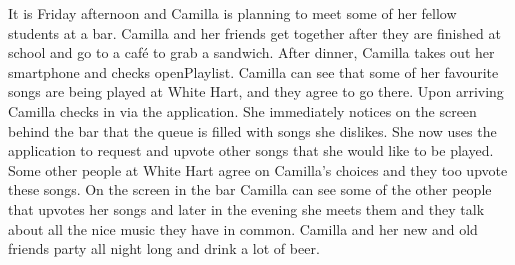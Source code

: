 It is Friday afternoon and Camilla is planning to meet some of her fellow students at a bar. Camilla and her friends get together after they are finished at school and go to a café to grab a sandwich. After dinner, Camilla takes out her smartphone and checks openPlaylist. Camilla can see that some of her favourite songs are being played at White Hart, and they agree to go there. Upon arriving Camilla checks in via the application. She immediately notices on the screen behind the bar that the queue is filled with songs she dislikes. She now uses the application to request and upvote other songs that she would like to be played. Some other people at White Hart agree on Camilla's choices and they too upvote these songs. On the screen in the bar Camilla can see some of the other people that upvotes her songs and later in the evening she meets them and they talk about all the nice music they have in common. Camilla and her new and old friends party all night long and drink a lot of beer.